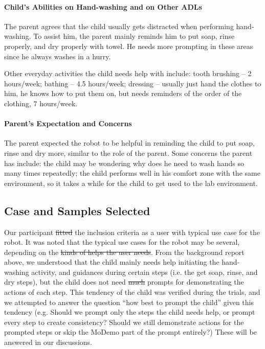 \documentclass{ut-thesis}
\providecommand{\DIFaddtex}[1]{{\protect\color{blue}\uwave{#1}}} %
\providecommand{\DIFdeltex}[1]{{\protect\color{red}\sout{#1}}}                      %
\providecommand{\DIFaddbegin}{} %
\providecommand{\DIFaddend}{} %
\providecommand{\DIFdelbegin}{} %
\providecommand{\DIFdelend}{} %
\providecommand{\DIFadd}[1]{\texorpdfstring{\DIFaddtex{#1}}{#1}} %
\providecommand{\DIFdel}[1]{\texorpdfstring{\DIFdeltex{#1}}{}} %
\begin{document}
\paragraph{Child's Abilities on Hand-washing and on Other ADLs}
The parent agrees that the child usually gets distracted when performing hand-washing.  To assist him, the parent mainly reminds him to put soap, rinse properly, and dry properly with towel.  He needs more prompting in these areas since he always washes in a hurry.

Other everyday activities the child needs help with include:  tooth brushing -- 2 hours/week; bathing -- 4.5 hours/week; dressing -- usually just hand the clothes to him, he knows how to put them on, but needs reminders of the order of the clothing, 7 hours/week.

\paragraph{Parent's Expectation and Concerns}
The parent expected the robot to be helpful in reminding the child to put soap, rinse and dry more, similar to the role of the parent.  Some concerns the parent has include: the child may be wondering why does he need to wash hands so many times repeatedly; the child performs well in his comfort zone with the same environment, so it takes a while for the child to get used to the lab environment.

\subsection{Case and Samples Selected}
\label{sec:CaseSamplesSelected}
Our participant \DIFdelbegin \DIFdel{fitted }\DIFdelend \DIFaddbegin \DIFadd{fits }\DIFaddend the inclusion criteria as a user with typical use case for the robot.  It was noted that the typical use cases for the robot may be several, depending on the \DIFdelbegin \DIFdel{kinds of helps the user needs}\DIFdelend \DIFaddbegin \DIFadd{kind of assistance the users requires}\DIFaddend .  From the background report above, we understood that the child mainly needs help initiating the hand-washing activity, and guidances during certain steps (i.e. the get soap, rinse, and dry steps), but the child does not need \DIFdelbegin \DIFdel{much }\DIFdelend \DIFaddbegin \DIFadd{many }\DIFaddend prompts for demonstrating the actions of each step.  This tendency of the child was verified during the trials, and we attempted to answer the question ``how best to prompt the child'' given this tendency (e.g. Should we prompt only the steps the child needs help, or prompt every step to create consistency?  Should we still demonstrate actions for the prompted steps or skip the MoDemo part of the prompt entirely?)  These will be answered in our discussions.
\end{document}

